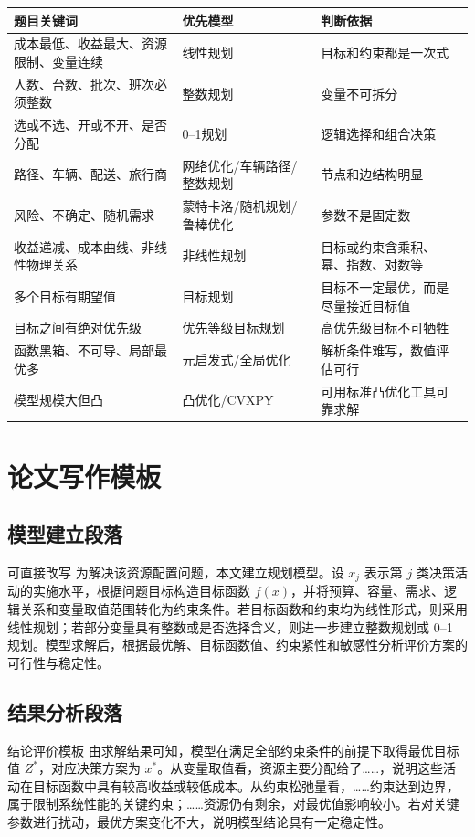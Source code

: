 \documentclass[11pt,a4paper]{ctexart}
\begin{document}
\begin{longtable}{p{4cm}p{4cm}p{6.2cm}}
\toprule
题目关键词 & 优先模型 & 判断依据 \\
\midrule
成本最低、收益最大、资源限制、变量连续 & 线性规划 & 目标和约束都是一次式 \\
人数、台数、批次、班次必须整数 & 整数规划 & 变量不可拆分 \\
选或不选、开或不开、是否分配 & 0--1规划 & 逻辑选择和组合决策 \\
路径、车辆、配送、旅行商 & 网络优化/车辆路径/整数规划 & 节点和边结构明显 \\
风险、不确定、随机需求 & 蒙特卡洛/随机规划/鲁棒优化 & 参数不是固定数 \\
收益递减、成本曲线、非线性物理关系 & 非线性规划 & 目标或约束含乘积、幂、指数、对数等 \\
多个目标有期望值 & 目标规划 & 目标不一定最优，而是尽量接近目标值 \\
目标之间有绝对优先级 & 优先等级目标规划 & 高优先级目标不可牺牲 \\
函数黑箱、不可导、局部最优多 & 元启发式/全局优化 & 解析条件难写，数值评估可行 \\
模型规模大但凸 & 凸优化/CVXPY & 可用标准凸优化工具可靠求解 \\
\bottomrule
\end{longtable}

\section{论文写作模板}

\subsection{模型建立段落}
\begin{paperbox}{可直接改写}
为解决该资源配置问题，本文建立规划模型。设 $x_j$ 表示第 $j$ 类决策活动的实施水平，根据问题目标构造目标函数 $f(x)$，并将预算、容量、需求、逻辑关系和变量取值范围转化为约束条件。若目标函数和约束均为线性形式，则采用线性规划；若部分变量具有整数或是否选择含义，则进一步建立整数规划或 0--1 规划。模型求解后，根据最优解、目标函数值、约束紧性和敏感性分析评价方案的可行性与稳定性。
\end{paperbox}

\subsection{结果分析段落}
\begin{paperbox}{结论评价模板}
由求解结果可知，模型在满足全部约束条件的前提下取得最优目标值 $Z^*$，对应决策方案为 $x^*$。从变量取值看，资源主要分配给了……，说明这些活动在目标函数中具有较高收益或较低成本。从约束松弛量看，……约束达到边界，属于限制系统性能的关键约束；……资源仍有剩余，对最优值影响较小。若对关键参数进行扰动，最优方案变化不大，说明模型结论具有一定稳定性。
\end{paperbox}
\end{document}
